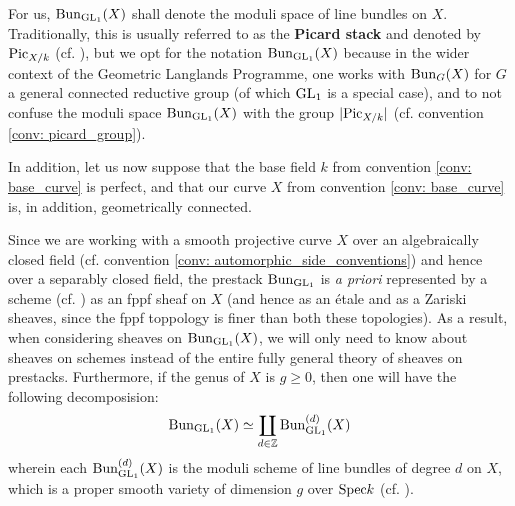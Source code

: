         \begin{convention} \label{conv: automorphic_side_conventions}
            For us, $\mathrm{Bun}_{\operatorname{GL}_1}(X)$ shall denote the moduli space of line bundles on $X$. Traditionally, this is usually referred to as the \textbf{Picard stack} and denoted by $\mathrm{Pic}_{X/k}$ (cf. \cite[\href{https://stacks.math.columbia.edu/tag/0372}{Tag 0372}]{stacks}), but we opt for the notation $\mathrm{Bun}_{\operatorname{GL}_1}(X)$ because in the wider context of the Geometric Langlands Programme, one works with $\mathrm{Bun}_G(X)$ for $G$ a general connected reductive group (of which $\operatorname{GL}_1$ is a special case), and to not confuse the moduli space $\mathrm{Bun}_{\operatorname{GL}_1}(X)$ with the group $|\mathrm{Pic}_{X/k}|$ (cf. convention \ref{conv: picard_group}). 
            
            In addition, let us now suppose that the base field $k$ from convention \ref{conv: base_curve} is perfect, and that our curve $X$ from convention \ref{conv: base_curve} is, in addition, geometrically connected.
        \end{convention}
        \begin{remark} \label{remark: geometry_of_the_picard_stack}
            Since we are working with a smooth projective curve $X$ over an algebraically closed field (cf. convention \ref{conv: automorphic_side_conventions}) and hence over a separably closed field, the prestack $\mathrm{Bun}_{\operatorname{GL}_1}$ is \textit{a priori} represented by a scheme (cf. \cite[\href{https://stacks.math.columbia.edu/tag/0B9Z}{Tag 0B9Z}]{stacks}) as an fppf sheaf on $X$ (and hence as an \'etale and as a Zariski sheaves, since the fppf toppology is finer than both these topologies). As a result, when considering sheaves on $\mathrm{Bun}_{\operatorname{GL}_1}(X)$, we will only need to know about sheaves on schemes instead of the entire fully general theory of sheaves on prestacks. Furthermore, if the genus of $X$ is $g \geq 0$, then one will have the following decomposision:
                $$\mathrm{Bun}_{\operatorname{GL}_1}(X) \simeq \coprod_{d \in \mathbb{Z}} \mathrm{Bun}_{\operatorname{GL}_1}^{(d)}(X)$$
            wherein each $\mathrm{Bun}_{\operatorname{GL}_1}^{(d)}(X)$ is the moduli scheme of line bundles of degree $d$ on $X$, which is a proper smooth variety of dimension $g$ over $\mathrm{Spec} k$ (cf. \cite[\href{https://stacks.math.columbia.edu/tag/0BA0}{Tag 0BA0}]{stacks}).
        \end{remark}
        

